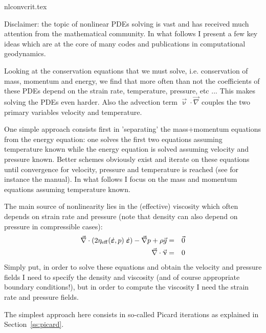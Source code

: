 \begin{flushright} {\tiny {\color{gray} nlconvcrit.tex}} \end{flushright}

Disclaimer: the topic of nonlinear PDEs solving is vast and has received 
much attention from the mathematical community. In what follows I present 
a few key ideas which are at the core of many codes and publications in 
computational geodynamics.

Looking at the conservation equations that we must solve, i.e. 
conservation of mass, momentum and energy, we find that more often 
than not the coefficients of these PDEs depend on the strain rate, 
temperature, pressure, etc ... 
This makes solving the PDEs even harder. 
Also the advection term $\vec{\upnu}\cdot \vec\nabla$ couples the two primary 
variables velocity and temperature. 

One simple approach consists first in 'separating' the mass+momentum equations 
from the energy equation: one solves the first two equations assuming temperature known
while the energy equation is solved assuming velocity and pressure known. 
Better schemes obviously exist and iterate on these equations until convergence 
for velocity, pressure and temperature is reached (see for instance the \aspect manual). 
In what follows I focus on the mass and momentum equations assuming temperature known. 

The main source of nonlinearity lies in the (effective) viscosity which often
depends on strain rate and pressure (note that density can also depend on pressure
in compressible cases):
\begin{eqnarray}
\vec\nabla\cdot (2 \eta_{\rm eff}(\dot{\bm\varepsilon},p) \;  \dot{\bm\varepsilon}) 
- \vec\nabla p + \rho \vec{g} &=& \vec{0} \nonumber\\
\vec\nabla \cdot \vec\upnu &=& 0\nonumber
\end{eqnarray}
Simply put, in order to solve these equations and obtain 
the velocity and pressure fields I need to specify the density and viscosity (and of course 
appropriate boundary conditions!), but in order to compute the viscosity I need the strain rate 
and pressure fields.  

The simplest approach here consists in so-called Picard iterations as 
explained in Section~\ref{ss:picard}.

